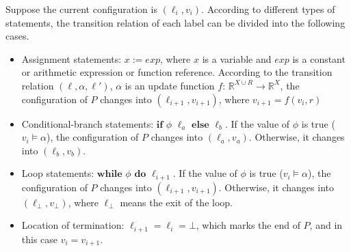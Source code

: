 \documentclass[runningheads]{llncs}
\newcommand\yx[1]{{\color{red} [YD: #1]}}
\begin{document}
Suppose the current configuration is $(\ell_i, v_i)$. According to different types of statements, the transition relation of each label can be divided into the following cases. 
\renewcommand{\labelitemi}{$\vcenter{\hbox{\tiny$\bullet$}}$}
\begin{itemize}
	\item  Assignment statements: $x:=exp$, where $x$ is a variable and $exp$ is a constant or arithmetic expression or function reference. According to the transition relation $(\ell, \alpha, \ell')$,
	$\alpha$ is an update function $f$: $\mathbb{R}^{X\cup R}\to \mathbb{R}^{X}$,
	the configuration of $P$ changes into $(\ell_{i+1}, v_{i+1})$, where $v_{i+1} = f(v_i,r)$
    \item  Conditional-branch statements: $\textbf{if}$ $\phi$ $\ell_a$ $\textbf{else}$ $\ell_b$. If the value of $\phi$ is true ($v_i \models \alpha$), 
    the configuration of $P$ changes into $(\ell_a, v_a)$. Otherwise, it changes into $(\ell_b, v_b)$.
	\item  Loop statements: $\textbf{while}$ $\phi$ $\textbf{do}$ $\ell_{i+1}$. If the value of $\phi$ is true ($v_i \models \alpha$), the configuration of $P$ changes into $(\ell_{i+1}, v_{i+1})$. Otherwise, it changes into $(\ell_{\bot}, v_{\bot})$, where $\ell_{\bot}$ means the exit of the loop.
	\item  Location of termination: $\ell_{i+1} =\ell_{i}=\bot$, which marks the end of $P$, and in this case $v_{i} = v_{i+1}$.
\end{itemize}
\end{document}
